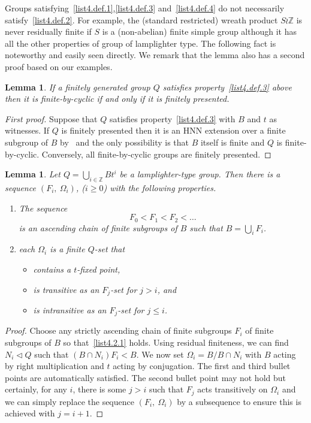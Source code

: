 \documentclass[11pt]{article}
\newtheorem{lemm}[theo]{Lemma}
\theoremstyle{definition}
\numberwithin{equation}{section}
\numberwithin{figure}{section}
\numberwithin{table}{section}
\newcommand{\normal}{\lhd}
\newcommand{\Z}{\mathbb{Z}}
\newcommand*{\romanenumi}{\renewcommand*{\theenumi}{\roman{enumi}}}
\begin{document}
Groups satisfying~\eqref{list4.def.1},\eqref{list4.def.3} and~\eqref{list4.def.4} do not necessarily satisfy~\eqref{list4.def.2}. For example, the (standard restricted) wreath product $S\wr\Z$ is never residually finite if $S$ is a (non-abelian) finite simple group although it has all the other properties of group of lamplighter type. The following fact is noteworthy and easily seen directly. We remark that the lemma also has a second proof based on our examples.

\begin{lemm}\label{lemmawith2proofs}
If a finitely generated group $Q$ satisfies property~\eqref{list4.def.3} above then it is finite-by-cyclic if and only if it is finitely presented.
\end{lemm}


\begin{proof}[First proof]
Suppose that $Q$ satisfies property~\eqref{list4.def.3} with $B$ and $t$ as witnesses. If $Q$ is finitely presented then it is an HNN extension over a finite subgroup of $B$ by~\cite[Theorem~A]{BS} and the only possibility is that $B$ itself is finite and $Q$ is finite-by-cyclic. Conversely, all finite-by-cyclic groups are finitely presented.
\end{proof}



\begin{lemm}\label{setup}
Let $Q=\bigcup_{i\in\Z}Bt^i$ be a lamplighter-type group. Then there is a sequence $(F_i,\ \Omega_i)$, ($i\ge0$) with the following properties.
\begin{enumerate}\romanenumi
\item \label{list4.2.1}The sequence
\[
F_0<F_1<F_2<\dots
\]
is an ascending chain of finite subgroups of $B$ such that $B=\bigcup_iF_i$.
\item \label{list4.2.2}each $\Omega_i$ is a finite $Q$-set that
\begin{itemize}
\item contains a $t$-fixed point,
\item is transitive as an $F_j$-set for $j>i$, and
\item is intransitive as an $F_j$-set for $j\le i$.
\end{itemize}
\end{enumerate}
\end{lemm}


\begin{proof}
Choose any strictly ascending chain of finite subgroups $F_i$ of finite subgroups of $B$ so that~\eqref{list4.2.1} holds. Using residual finiteness, we can find $N_i\normal Q$ such that $(B\cap N_i)F_i<B$. We now set $\Omega_i=B/B\cap N_i$ with $B$ acting by right multiplication and $t$ acting by conjugation. The first and third bullet points are automatically satisfied. The second bullet point may not hold but certainly, for any $i$, there is some $j>i$ such that $F_j$ acts transitively on $\Omega_i$ and we can simply replace the sequence $(F_i,\ \Omega_i)$ by a subsequence to ensure this is achieved with $j=i+1$.
\end{proof}
\end{document}
